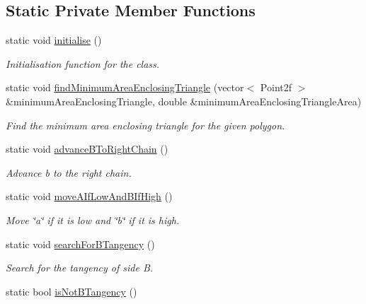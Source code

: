 \subsection*{Static Private Member Functions}
\begin{DoxyCompactItemize}
\item 
static void \hyperlink{classmultiscale_1_1MinimumAreaEnclosingTriangle_a5517774074e5cc22cafcdb523212eeb6}{initialise} ()
\begin{DoxyCompactList}\small\item\em Initialisation function for the class. \end{DoxyCompactList}\item 
static void \hyperlink{classmultiscale_1_1MinimumAreaEnclosingTriangle_a18f69d582395376b335641e046ecc53d}{find\-Minimum\-Area\-Enclosing\-Triangle} (vector$<$ Point2f $>$ \&minimum\-Area\-Enclosing\-Triangle, double \&minimum\-Area\-Enclosing\-Triangle\-Area)
\begin{DoxyCompactList}\small\item\em Find the minimum area enclosing triangle for the given polygon. \end{DoxyCompactList}\item 
static void \hyperlink{classmultiscale_1_1MinimumAreaEnclosingTriangle_a772ac3b9529eccbce7af2c72a0360d89}{advance\-B\-To\-Right\-Chain} ()
\begin{DoxyCompactList}\small\item\em Advance b to the right chain. \end{DoxyCompactList}\item 
static void \hyperlink{classmultiscale_1_1MinimumAreaEnclosingTriangle_a350b2e78503488433a0ae5a7a2a22f64}{move\-A\-If\-Low\-And\-B\-If\-High} ()
\begin{DoxyCompactList}\small\item\em Move \char`\"{}a\char`\"{} if it is low and \char`\"{}b\char`\"{} if it is high. \end{DoxyCompactList}\item 
static void \hyperlink{classmultiscale_1_1MinimumAreaEnclosingTriangle_a963feccd69c5ea86bbf4965d91ed32ed}{search\-For\-B\-Tangency} ()
\begin{DoxyCompactList}\small\item\em Search for the tangency of side B. \end{DoxyCompactList}\item 
static bool \hyperlink{classmultiscale_1_1MinimumAreaEnclosingTriangle_ab8fcbbabc20d96ebaf6edeeaf0d38e63}{is\-Not\-B\-Tangency} ()

\end{DoxyCompactItemize}
